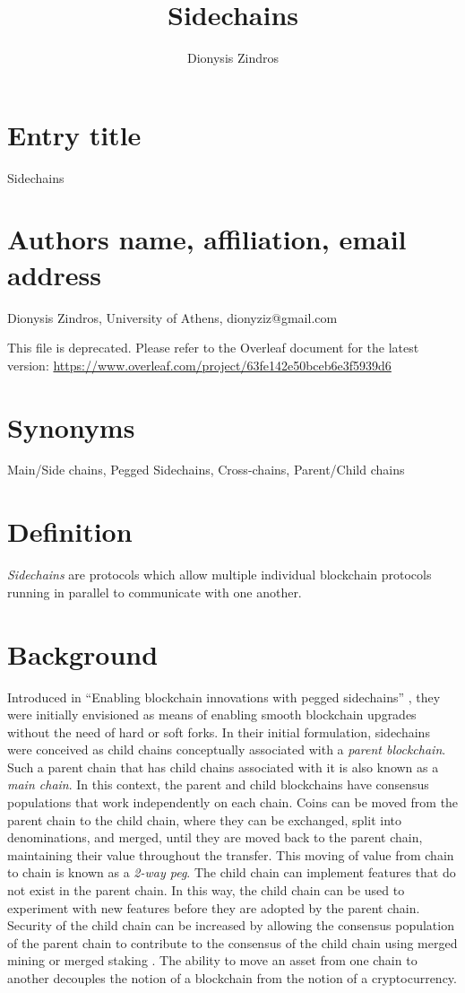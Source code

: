\documentclass[runningheads]{format/llncs}
\title{
Sidechains
}
\author{Dionysis Zindros}
\institute{University of Athens}
\begin{document}
\maketitle

\section*{Entry title}
Sidechains

\section*{Authors name, affiliation, email address}
Dionysis Zindros,
University of Athens,
dionyziz@gmail.com

This file is deprecated. Please refer to the Overleaf document for the latest version:
\url{https://www.overleaf.com/project/63fe142e50bceb6e3f5939d6}

\section*{Synonyms}
Main/Side chains, Pegged Sidechains, Cross-chains, Parent/Child chains

\section*{Definition}
\emph{Sidechains} are protocols which allow multiple individual blockchain protocols running in parallel to communicate with one another.

\section*{Background}
Introduced in ``Enabling blockchain innovations with pegged sidechains'' \cite{sidechains}, they were initially envisioned as means of enabling smooth blockchain upgrades without the need of hard or soft forks. In their initial formulation, sidechains were conceived as child chains conceptually associated with a \emph{parent blockchain}. Such a parent chain that has child chains associated with it is also known as a \emph{main chain}. In this context, the parent and child blockchains have consensus populations that work independently on each chain. Coins can be moved from the parent chain to the child chain, where they can be exchanged, split into denominations, and merged, until they are moved back to the parent chain, maintaining their value throughout the transfer. This moving of value from chain to chain is known as a \emph{2-way peg}. The child chain can implement features that do not exist in the parent chain. In this way, the child chain can be used to experiment with new features before they are adopted by the parent chain. Security of the child chain can be increased by allowing the consensus population of the parent chain to contribute to the consensus of the child chain using merged mining or merged staking \cite{pos-sidechains}. The ability to move an asset from one chain to another decouples the notion of a blockchain from the notion of a cryptocurrency.
\end{document}
